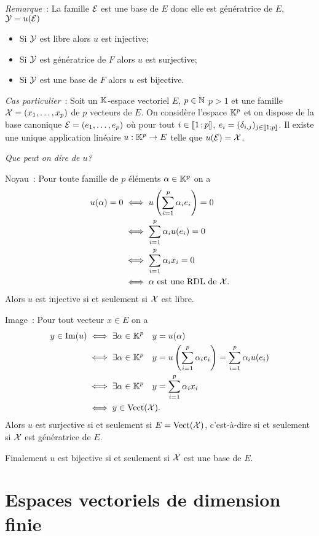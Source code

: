\emph{Remarque}~: La famille \(\mathcal{E}\) est une base de \(E\) donc elle est
génératrice de \(E\), \(\mathcal{Y}=u(\mathcal{E})\)
\begin{itemize}
  \item Si \(\mathcal{Y}\) est libre alors \(u\) est injective;
  \item Si \(\mathcal{Y}\) est génératrice de \(F\) alors \(u\) est surjective;
  \item Si \(\mathcal{Y}\) est une base de \(F\) alors \(u\) est bijective.
\end{itemize}

\emph{Cas particulier}~: Soit un \(\mathbb{K}\)-espace vectoriel \(E\), \(p \in \mathbb{N}\)
\(p>1\) et une famille \(\mathcal{X}=(x_1, \ldots, x_p)\) de \(p\) vecteurs de \(E\). On
considère l'espace \(\mathbb{K}^p\) et on dispose de la base canonique \(\mathcal{E}=(e_1,
\ldots, e_p)\) où pour tout \(i \in \mathopen{\llbracket}1\mathclose{}\mathpunct{};p\mathclose{\rrbracket}\), \(e_i =
(\delta_{i,j})_{j \in \mathopen{\llbracket}1\mathclose{}\mathpunct{};p\mathclose{\rrbracket}}\). Il existe une unique
application linéaire \(u : \mathbb{K}^p \rightarrow E\) telle que \(u(\mathcal{E})=\mathcal{X}\).

\emph{Que peut on dire de \(u\)?}

Noyau~: Pour toute famille de \(p\) éléments \(\alpha \in \mathbb{K}^p\) on a
\begin{align}
  u(\alpha)=0 &\iff u\left(\sum_{i=1}^p \alpha_i e_i \right)=0\\
  &\iff \sum_{i=1}^p \alpha_i u(e_i) =0\\
  &\iff \sum_{i=1}^p \alpha_i x_i =0\\
  &\iff \alpha \text{~est une RDL de } \mathcal{X}.
\end{align}
Alors \(u\) est injective si et seulement si \(\mathcal{X}\) est libre.

Image~: Pour tout vecteur \(x \in E\) on a
\begin{align}
  y \in \operatorname{Im}(u) &\iff \exists \alpha \in \mathbb{K}^p \quad y=u(\alpha)\\
  &\iff \exists \alpha \in \mathbb{K}^p \quad y=u\left(\sum_{i=1}^p \alpha_i e_i
  \right)= \sum_{i=1}^p \alpha_i u(e_i) \\
  &\iff \exists \alpha \in \mathbb{K}^p \quad y=\sum_{i=1}^p \alpha_i x_i\\
  &\iff y \in \operatorname{Vect}(\mathcal{X}).
\end{align}
Alors \(u\) est surjective si et seulement si \(E=\operatorname{Vect}(\mathcal{X})\),
c'est-à-dire si et seulement si \(\mathcal{X}\) est génératrice de \(E\).

Finalement \(u\) est bijective si et seulement si \(\mathcal{X}\) est une base de \(E\).

\section{Espaces vectoriels de dimension finie}

